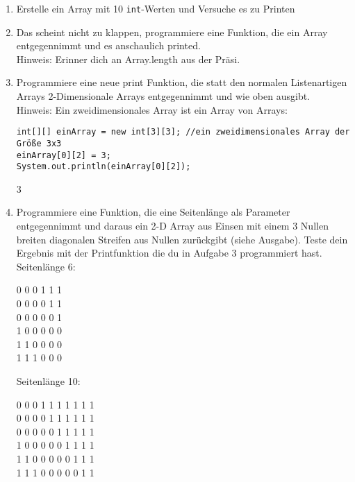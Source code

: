 \documentclass{../../sheet}
\begin{document}
\newpage
{}


\begin{enumerate}
    \item Erstelle ein Array mit 10 \texttt{int}-Werten und Versuche es zu Printen
    \item Das scheint nicht zu klappen, programmiere eine Funktion, die ein Array entgegennimmt und es anschaulich printed.\\
          Hinweis: Erinner dich an Array.length aus der Präsi.
    \item Programmiere eine neue print Funktion, die statt den normalen Listenartigen Arrays 2-Dimensionale Arrays entgegennimmt und wie oben ausgibt.\\
    Hinweis: Ein zweidimensionales Array ist ein Array von Arrays:
    \begin{verbatim}
int[][] einArray = new int[3][3]; //ein zweidimensionales Array der Größe 3x3
einArray[0][2] = 3;
System.out.println(einArray[0][2]);
    \end{verbatim}
    \begin{ausgabe}
        3
    \end{ausgabe}
    \item Programmiere eine Funktion, die eine Seitenlänge als Parameter entgegennimmt und daraus ein 2-D Array aus Einsen mit einem 3 Nullen breiten diagonalen Streifen aus Nullen zurückgibt (siehe Ausgabe). Teste dein Ergebnis mit der Printfunktion die du in Aufgabe 3 programmiert hast.\\
          Seitenlänge 6:
          \begin{ausgabe}
              0 0 0 1 1 1\\
              0 0 0 0 1 1\\
              0 0 0 0 0 1\\
              1 0 0 0 0 0\\
              1 1 0 0 0 0\\
              1 1 1 0 0 0
          \end{ausgabe}
          Seitenlänge 10:
          \begin{ausgabe}
              0 0 0 1 1 1 1 1 1 1 \\
              0 0 0 0 1 1 1 1 1 1 \\
              0 0 0 0 0 1 1 1 1 1 \\
              1 0 0 0 0 0 1 1 1 1 \\
              1 1 0 0 0 0 0 1 1 1 \\
              1 1 1 0 0 0 0 0 1 1 \\

\end{ausgabe}
\end{enumerate}
\end{document}
